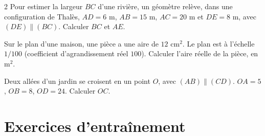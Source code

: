 \begin{multicols}{2}
\exo{} Pour estimer la largeur $BC$ d'une rivière, un géomètre relève, dans une
configuration de Thalès, $AD=6$ m, $AB=15$ m, $AC=20$ m et $DE=8$ m, avec $(DE)\parallel(BC)$.
Calculer $BC$ et $AE$.

\exo{} Sur le plan d'une maison, une pièce a une aire de $12\text{ cm}^2$. Le plan
est à l'échelle $1/100$ (coefficient d'agrandissement réel $100$). Calculer l'aire réelle de
la pièce, en $\text{m}^2$.

\exo{} Deux allées d'un jardin se croisent en un point $O$, avec $(AB)\parallel(CD)$.
$OA=5$, $OB=8$, $OD=24$. Calculer $OC$.

\end{multicols}

\section{Exercices d'entraînement}
